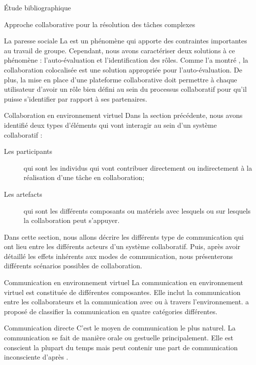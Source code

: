 \documentclass[myfrancais,ngerman,english,french]{mythesis}
\begin{document}
\begin{mychapter}{Étude bibliographique}
\begin{mysection}{Approche collaborative pour la résolution des tâches complexes}
\begin{mysubsection}{La paresse sociale}
				La  est un phénomène qui apporte des contraintes importantes au travail de groupe.
				Cependant, nous avons caractériser deux solutions à ce phénomène : l'auto-évaluation et l'identification des rôles.
				Comme l'a montré , la collaboration colocalisée est une solution appropriée pour l'auto-évaluation.
				De plus, la mise en place d'une plateforme collaborative doit permettre à chaque utilisateur d'avoir un rôle bien défini au sein du processus collaboratif pour qu'il puisse s'identifier par rapport à ses partenaires.
			\end{mysubsection}
		\end{mysection}
		\begin{mysection}{Collaboration en environnement virtuel}
			Dans la section précédente, nous avons identifié deux types d'éléments qui vont interagir au sein d'un système collaboratif :
			\begin{description}
				\item[Les participants] qui sont les individus qui vont contribuer directement ou indirectement à la réalisation d'une tâche en collaboration;
				\item[Les artefacts] qui sont les différents composants ou matériels avec lesquels ou sur lesquels la collaboration peut s'appuyer.
			\end{description}
			Dans cette section, nous allons décrire les différents type de communication qui ont lieu entre les différents acteurs d'un système collaboratif.
			Puis, après avoir détaillé les effets inhérents aux modes de communication, nous présenterons différents scénarios possibles de collaboration.
			\begin{mysubsection}{Communication en environnement virtuel}
				La communication en environnement virtuel est constituée de différentes composantes.
				Elle inclut la communication entre les collaborateurs et la communication avec ou à travers l'environnement.
				 a proposé de classifier la communication en quatre catégories différentes.
				\begin{mysubsubsection}{Communication directe}
					C'est le moyen de communication le plus naturel.
					La communication se fait de manière orale ou gestuelle principalement.
					Elle est conscient la plupart du temps mais peut contenir une part de communication inconsciente d'après .

\end{mysubsubsection}
\end{mysubsection}
\end{mysection}
\end{mychapter}
\end{document}
